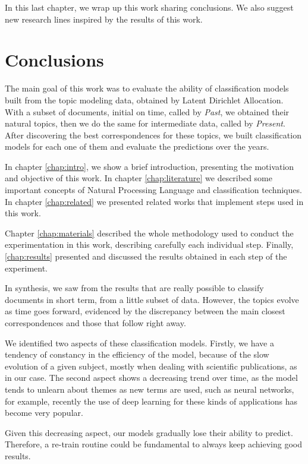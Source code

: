 In this last chapter, we wrap up this work sharing conclusions. We also suggest new research lines inspired by the results of this work.

\section{Conclusions}

The main goal of this work was to evaluate the ability of classification models built from the topic modeling data, obtained by Latent Dirichlet Allocation. With a subset of documents, initial on time, called by \textit{Past}, we obtained their natural topics, then we do the same for intermediate data, called by \textit{Present}. After discovering the best correspondences for these topics, we built classification models for each one of them and evaluate the predictions over the years.

In chapter \ref{chap:intro}, we show a brief introduction, presenting the motivation and objective of this work. In chapter \ref{chap:literature} we described some important concepts of Natural Processing Language and classification techniques. In chapter \ref{chap:related} we presented related works that implement steps used in this work. 

Chapter \ref{chap:materials} described the whole methodology used to conduct the experimentation in this work, describing carefully each individual step. Finally, \ref{chap:results} presented and discussed the results obtained in each step of the experiment.

In synthesis, we saw from the results that are really possible to classify documents in short term, from a little subset of data. However, the topics evolve as time goes forward, evidenced by the discrepancy between the main closest correspondences and those that follow right away.

We identified two aspects of these classification models. Firstly, we have a tendency of constancy in the efficiency of the model, because of the slow evolution of a given subject, mostly when dealing with scientific publications, as in our case. The second aspect shows a decreasing trend over time, as the model tends to unlearn about themes as new terms are used, such as neural networks, for example, recently the use of deep learning for these kinds of applications has become very popular.

Given this decreasing aspect, our models gradually lose their ability to predict. Therefore, a re-train routine could be fundamental to always keep achieving good results.

